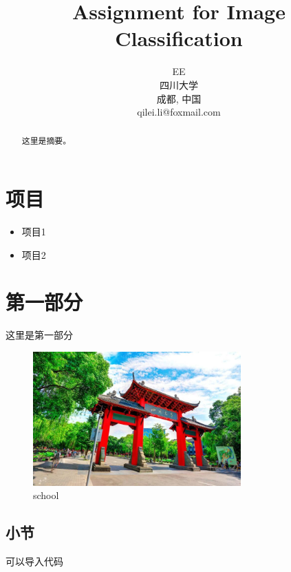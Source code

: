 \documentclass[10pt, conference, compsocconf]{IEEEtran}
\begin{document}
	\begin{CJK}{UTF8}{gbsn}

\title{Assignment for Image Classification}

\author
{
    \IEEEauthorblockA
    {
    EE\\
    四川大学\\
    成都, 中国\\
    qilei.li@foxmail.com
    }
}

\maketitle

\begin{abstract}
这里是摘要。
\end{abstract}


\IEEEpeerreviewmaketitle

\section{项目}
\begin{itemize}
	\item	项目1
	\item	项目2

	
\end{itemize}

\section{第一部分}
这里是第一部分


\begin{figure}[h]
	\includegraphics[width=8cm]{school.jpg}
	\caption{school} 
	\label{school}
\end{figure}




\subsection{小节}
可以导入代码




\end{CJK}
\end{document}
